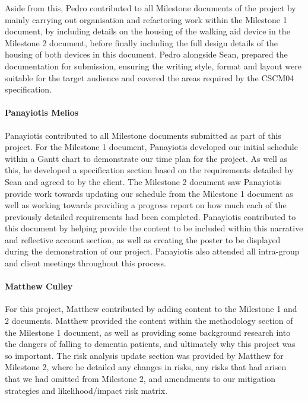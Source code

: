                 Aside from this, Pedro contributed to all Milestone documents of the project by mainly carrying out organisation and refactoring work within the Milestone 1 document, by including details on the housing of the walking aid device in the Milestone 2 document, before finally including the full design details of the housing of both devices in this document. Pedro alongside Sean, prepared the documentation for submission, ensuring the writing style, format and layout were suitable for the target audience and covered the areas required by the CSCM04 specification.

                \paragraph{Panayiotis Melios}\mbox{}

                Panayiotis contributed to all Milestone documents submitted as part of this project. For the Milestone 1 document, Panayiotis developed our initial schedule within a Gantt chart to demonstrate our time plan for the project. As well as this, he developed a specification section based on the requirements detailed by Sean and agreed to by the client. The Milestone 2 document saw Panayiotis provide work towards updating our schedule from the Milestone 1 document as well as working towards providing a progress report on how much each of the previously detailed requirements had been completed. Panayiotis contributed to this document by helping provide the content to be included within this narrative and reflective account section, as well as creating the poster to be displayed during the demonstration of our project. Panayiotis also attended all intra-group and client meetings throughout this process. 

                \paragraph{Matthew Culley}\mbox{}

                For this project, Matthew contributed by adding content to the Milestone 1 and 2 documents. Matthew provided the content within the methodology section of the Milestone 1 document, as well as providing some background research into the dangers of falling to dementia patients, and ultimately why this project was so important. The risk analysis update section was provided by Matthew for Milestone 2, where he detailed any changes in risks, any risks that had arisen that we had omitted from Milestone 2, and amendments to our mitigation strategies and likelihood/impact risk matrix.

